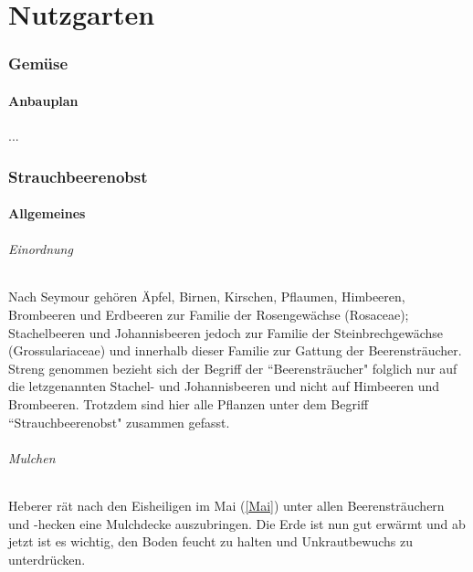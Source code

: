 \part{Nutzgarten}

\pagebreak

\section{Gemüse}

\subsection{Anbauplan}
...

\pagebreak

\section{Strauchbeerenobst}
\label{Strauchbeerenobst}

\subsection{Allgemeines}
\label{Strauchbeerenobst_allgemein}

\paragraph{Einordnung} 

Nach Seymour \cite[S.~168]{Seymour1978} gehören Äpfel, Birnen, Kirschen, Pflaumen, Himbeeren, Brombeeren und Erdbeeren zur Familie der Rosengewächse (Rosaceae);
Stachelbeeren und Johannisbeeren jedoch zur Familie der Steinbrechgewächse (Grossulariaceae) und innerhalb dieser Familie zur Gattung der Beerensträucher.
Streng genommen bezieht sich der Begriff der ``Beerensträucher" folglich nur auf die letzgenannten Stachel- und Johannisbeeren und nicht auf Himbeeren und Brombeeren.
Trotzdem sind hier alle Pflanzen unter dem Begriff ``Strauchbeerenobst" zusammen gefasst.

\paragraph{Mulchen}

Heberer \cite[S.~44]{Heberer2018} rät nach den Eisheiligen im \textrightarrow Mai (\ref{Mai}) unter allen Beerensträuchern und -hecken eine Mulchdecke auszubringen.
Die Erde ist nun gut erwärmt und ab jetzt ist es wichtig, den Boden feucht zu halten und Unkrautbewuchs zu unterdrücken.

